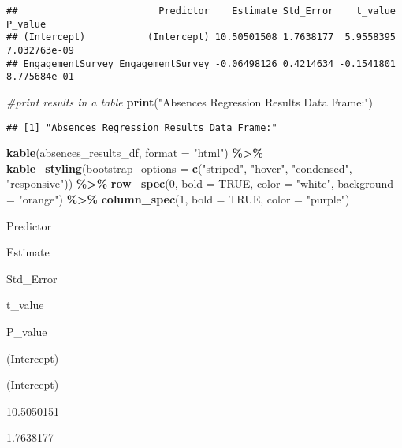 \documentclass[
]{article}
\newenvironment{Shaded}{\begin{snugshade}}{\end{snugshade}}
\newcommand{\AttributeTok}[1]{\textcolor[rgb]{0.13,0.29,0.53}{#1}}
\newcommand{\CommentTok}[1]{\textcolor[rgb]{0.56,0.35,0.01}{\textit{#1}}}
\newcommand{\ConstantTok}[1]{\textcolor[rgb]{0.56,0.35,0.01}{#1}}
\newcommand{\DecValTok}[1]{\textcolor[rgb]{0.00,0.00,0.81}{#1}}
\newcommand{\FunctionTok}[1]{\textcolor[rgb]{0.13,0.29,0.53}{\textbf{#1}}}
\newcommand{\NormalTok}[1]{#1}
\newcommand{\SpecialCharTok}[1]{\textcolor[rgb]{0.81,0.36,0.00}{\textbf{#1}}}
\newcommand{\StringTok}[1]{\textcolor[rgb]{0.31,0.60,0.02}{#1}}
\begin{document}
\begin{verbatim}
##                         Predictor    Estimate Std_Error    t_value      P_value
## (Intercept)           (Intercept) 10.50501508 1.7638177  5.9558395 7.032763e-09
## EngagementSurvey EngagementSurvey -0.06498126 0.4214634 -0.1541801 8.775684e-01
\end{verbatim}

\begin{Shaded}
\begin{Highlighting}[]
\CommentTok{\#print results in a table}
\FunctionTok{print}\NormalTok{(}\StringTok{"Absences Regression Results Data Frame:"}\NormalTok{)}
\end{Highlighting}
\end{Shaded}

\begin{verbatim}
## [1] "Absences Regression Results Data Frame:"
\end{verbatim}

\begin{Shaded}
\begin{Highlighting}[]
\FunctionTok{kable}\NormalTok{(absences\_results\_df, }\AttributeTok{format =} \StringTok{"html"}\NormalTok{) }\SpecialCharTok{\%\textgreater{}\%}
  \FunctionTok{kable\_styling}\NormalTok{(}\AttributeTok{bootstrap\_options =} \FunctionTok{c}\NormalTok{(}\StringTok{"striped"}\NormalTok{, }\StringTok{"hover"}\NormalTok{, }\StringTok{"condensed"}\NormalTok{, }\StringTok{"responsive"}\NormalTok{)) }\SpecialCharTok{\%\textgreater{}\%}
  \FunctionTok{row\_spec}\NormalTok{(}\DecValTok{0}\NormalTok{, }\AttributeTok{bold =} \ConstantTok{TRUE}\NormalTok{, }\AttributeTok{color =} \StringTok{"white"}\NormalTok{, }\AttributeTok{background =} \StringTok{"orange"}\NormalTok{) }\SpecialCharTok{\%\textgreater{}\%}
  \FunctionTok{column\_spec}\NormalTok{(}\DecValTok{1}\NormalTok{, }\AttributeTok{bold =} \ConstantTok{TRUE}\NormalTok{, }\AttributeTok{color =} \StringTok{"purple"}\NormalTok{)}
\end{Highlighting}
\end{Shaded}

Predictor

Estimate

Std\_Error

t\_value

P\_value

(Intercept)

(Intercept)

10.5050151

1.7638177
\end{document}
